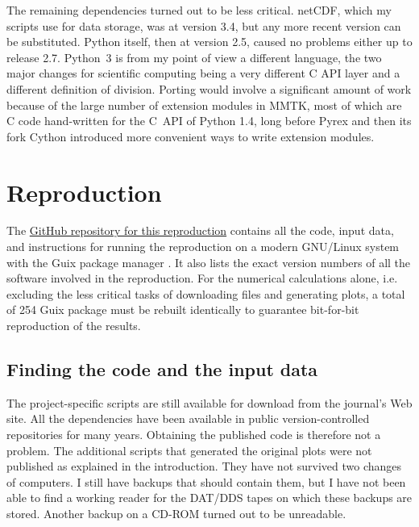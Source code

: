 The remaining dependencies turned out to be less critical. netCDF, which my scripts use for data storage, was at version 3.4, but any more recent version can be substituted. Python itself, then at version 2.5, caused no problems either up to release 2.7. Python~3 is from my point of view a different language, the two major changes for scientific computing being a very different C API layer and a different definition of division. Porting would involve a significant amount of work because of the large number of extension modules in MMTK, most of which are C code hand-written for the C~API of Python 1.4, long before Pyrex \cite{EwingPyrex} and then its fork Cython \cite{BehnelCythonBestBoth2011} introduced more convenient ways to write extension modules.

\section*{Reproduction}

The \href{https://github.com/khinsen/rescience-ten-year-challenge-paper-3}{GitHub repository for this reproduction} contains all the code, input data, and instructions for running the reproduction on a modern GNU/Linux system with the Guix package manager \cite{CourtesReproducibleUserControlledSoftware2015,WurmusPiGxreproduciblegenomics2018}. It also lists the exact version numbers of all the software involved in the reproduction. For the numerical calculations alone, i.e. excluding the less critical tasks of downloading files and generating plots, a total of 254 Guix package must be rebuilt identically to guarantee bit-for-bit reproduction of the results.

\subsection*{Finding the code and the input data}

The project-specific scripts are still available for download from the journal's Web site. All the dependencies have been available in public version-controlled repositories for many years. Obtaining the published code is therefore not a problem. The additional scripts that generated the original plots were not published as explained in the introduction. They have not survived two changes of computers. I still have backups that should contain them, but I have not been able to find a working reader for the DAT/DDS tapes on which these backups are stored. Another backup on a CD-ROM turned out to be unreadable.

